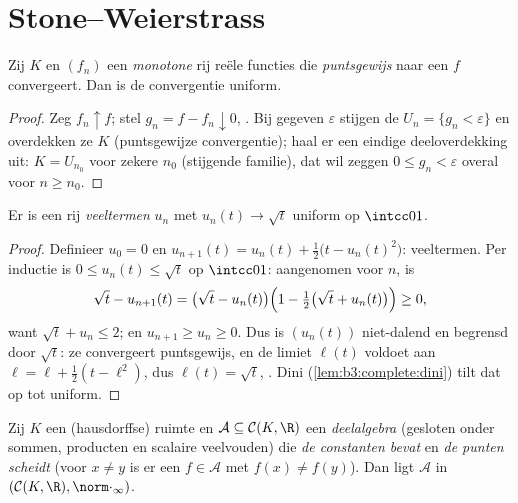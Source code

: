 \section{Stone--Weierstrass}

\begin{lemma}[Dini]\label{lem:b3:complete:dini}
Zij $K$  en $(f_n)$ een \emph{monotone} rij  reële
functies die \emph{puntsgewijs} naar een  $f$
convergeert. Dan is de convergentie uniform.
\end{lemma}

\begin{proof}
Zeg $f_n \uparrow f$; stel $g_n = f - f_n \downarrow 0$, .
Bij gegeven $\varepsilon$ stijgen de  $U_n =
\{g_n < \varepsilon\}$ en overdekken ze $K$ (puntsgewijze
convergentie); haal er een eindige deeloverdekking uit: $K =
U_{n_0}$ voor zekere $n_0$ (stijgende familie), dat wil zeggen $0
\leq g_n < \varepsilon$ overal voor $n \geq n_0$.
\end{proof}

\begin{lemma}\label{lem:b3:complete:sqrt}
Er is een rij \emph{veeltermen} $u_n$ met $u_n(t) \to \sqrt t$
uniform op $\intcc01$.
\end{lemma}

\begin{proof}
Definieer $u_0 = 0$ en $u_{n+1}(t) = u_n(t) + \frac12\bigl(t -
u_n(t)^2\bigr)$: veeltermen. Per inductie is $0 \leq u_n(t) \leq
\sqrt t$ op $\intcc01$: aangenomen voor $n$, is
\[
\sqrt t - u_{n+1}(t) = \bigl(\sqrt t - u_n(t)\bigr)
\Bigl(1 - \tfrac12\bigl(\sqrt t + u_n(t)\bigr)\Bigr) \geq 0,
\]
want $\sqrt t + u_n \leq 2$; en $u_{n+1} \geq u_n \geq 0$. Dus is
$(u_n(t))$ niet-dalend en begrensd door $\sqrt t$: ze convergeert
puntsgewijs, en de limiet $\ell(t)$ voldoet aan $\ell = \ell +
\frac12(t - \ell^2)$, dus $\ell(t) = \sqrt t$, . Dini
(\cref{lem:b3:complete:dini}) tilt dat op tot uniform.
\end{proof}

\begin{theorem}
\label{thm:b3:complete:stoneweierstrass}
Zij $K$ een  (hausdorffse) ruimte en $\mathcal A \subseteq
\mathcal C(K, \R)$ een \emph{deelalgebra} (gesloten onder sommen,
producten en scalaire veelvouden) die \emph{de constanten bevat}
en \emph{de punten scheidt} (voor $x \neq y$ is er een $f \in
\mathcal A$ met $f(x) \neq f(y)$). Dan ligt $\mathcal A$  in
$(\mathcal C(K,\R), \norm\cdot_\infty)$.
\end{theorem}

